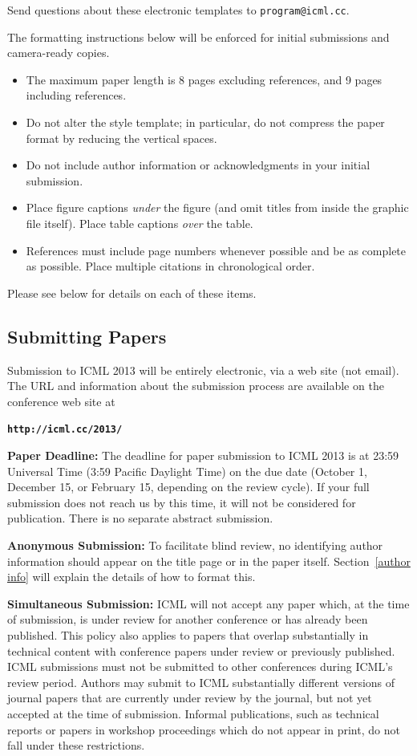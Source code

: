 \documentclass{article}
\begin{document}
\noindent
Send questions about these electronic templates to
\texttt{program@icml.cc}.

The formatting instructions below will be enforced for initial submissions and camera-ready copies. 
\begin{itemize}
\item The maximum paper length is 8 pages excluding references, and 
9 pages including references.
\item Do not alter the style template; in particular, do not compress the paper format 
by reducing the vertical spaces.
\item Do not include author information or acknowledgments in your
  initial submission. 
\item Place figure captions {\em under} the figure (and omit titles from
  inside the graphic file itself).  Place table captions {\em over}
  the table.
\item References must include page numbers whenever possible and be as
  complete as possible.  Place multiple citations in chronological order.  
\end{itemize}
Please see below for details on each of these items.

\subsection{Submitting Papers}

Submission to ICML 2013 will be entirely electronic, via a web site
(not email).  The URL and information about the submission process
are available on the conference web site at

\textbf{\texttt{http://icml.cc/2013/}}

{\bf Paper Deadline:} The deadline for paper submission to ICML 2013
is at 23:59 Universal Time (3:59 Pacific Daylight Time) on the due date
(October 1, December 15, or February 15, depending on the review cycle).  
If your full submission does not reach us by this time, it will 
not be considered for publication. There is no separate abstract submission.

{\bf Anonymous Submission:} To facilitate blind review, no identifying
author information should appear on the title page or in the paper
itself.  Section~\ref{author info} will explain the details of how to
format this.

{\bf Simultaneous Submission:} ICML will not accept any paper which,
at the time of submission, is under review for another conference or
has already been published. This policy also applies to papers that
overlap substantially in technical content with conference papers
under review or previously published. ICML submissions must not be
submitted to other conferences during ICML's review period. Authors
may submit to ICML substantially different versions of journal papers
that are currently under review by the journal, but not yet accepted
at the time of submission. Informal publications, such as technical
reports or papers in workshop proceedings which do not appear in
print, do not fall under these restrictions.
\end{document}
